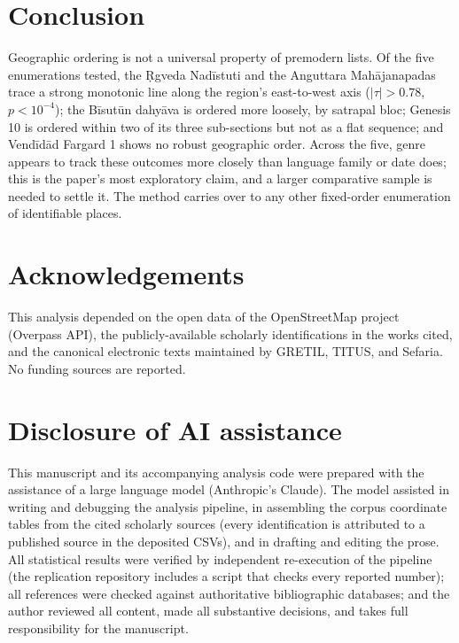 \documentclass[11pt]{article}
\begin{document}
\section{Conclusion}\label{sec:conclusion}

Geographic ordering is not a universal property of premodern lists.
Of the five enumerations tested, the Ṛgveda Nadīstuti and the
Anguttara Mahājanapadas trace a strong monotonic line along the
region's east-to-west axis ($|\tau| > 0.78$, $p < 10^{-4}$); the
Bīsutūn dahyāva is ordered more loosely, by satrapal bloc; Genesis
10 is ordered within two of its three sub-sections but not as a flat
sequence; and Vendīdād Fargard 1 shows no robust geographic order. Across the
five, genre appears to track these outcomes more closely than
language family or date does; this is the paper's most exploratory
claim, and a larger comparative sample is needed to settle it. The
method carries over to any other fixed-order enumeration of
identifiable places.

\section*{Acknowledgements}
This analysis depended on the open data of the OpenStreetMap
project (Overpass API), the publicly-available scholarly
identifications in the works cited, and the canonical electronic
texts maintained by GRETIL, TITUS, and Sefaria. No funding sources
are reported.

\section*{Disclosure of AI assistance}
This manuscript and its accompanying analysis code were prepared
with the assistance of a large language model (Anthropic's Claude).
The model assisted in writing and debugging the analysis pipeline,
in assembling the corpus coordinate tables from the cited scholarly
sources (every identification is attributed to a published source in
the deposited CSVs), and in drafting and editing the prose. All
statistical results were verified by independent re-execution of the
pipeline (the replication repository includes a script that checks
every reported number); all references were checked against
authoritative bibliographic databases; and the author reviewed all
content, made all substantive decisions, and takes full
responsibility for the manuscript.
\end{document}
